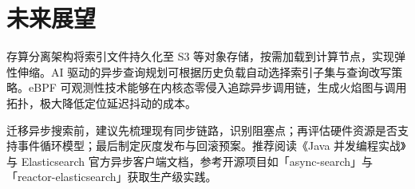 \chapter{未来展望}
存算分离架构将索引文件持久化至 S3 等对象存储，按需加载到计算节点，实现弹性伸缩。AI 驱动的异步查询规划可根据历史负载自动选择索引子集与查询改写策略。eBPF 可观测性技术能够在内核态零侵入追踪异步调用链，生成火焰图与调用拓扑，极大降低定位延迟抖动的成本。\par
迁移异步搜索前，建议先梳理现有同步链路，识别阻塞点；再评估硬件资源是否支持事件循环模型；最后制定灰度发布与回滚预案。推荐阅读《Java 并发编程实战》与 Elasticsearch 官方异步客户端文档，参考开源项目如「async-search」与「reactor-elasticsearch」获取生产级实践。\par
